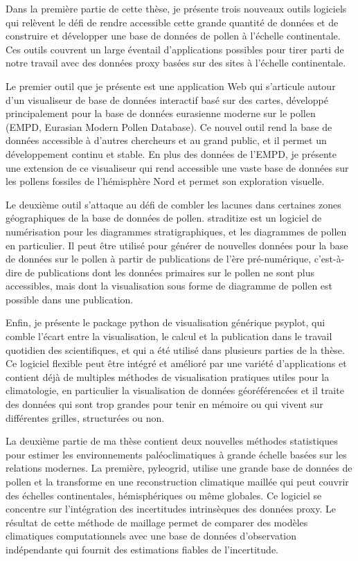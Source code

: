 \begin{thesisabstract}[]
Dans la première partie de cette thèse, je présente trois nouveaux outils logiciels qui relèvent le défi de rendre accessible cette grande quantité de données et de construire et développer une base de données de pollen à l'échelle continentale. Ces outils couvrent un large éventail d'applications possibles pour tirer parti de notre travail avec des données proxy basées sur des sites à l'échelle continentale.

Le premier outil que je présente est une application Web qui s'articule autour d'un visualiseur de base de données interactif basé sur des cartes, développé principalement pour la base de données eurasienne moderne sur le pollen (EMPD, Eurasian Modern Pollen Database). Ce nouvel outil rend la base de données accessible à d'autres chercheurs et au grand public, et il permet un développement continu et stable. En plus des données de l'EMPD, je présente une extension de ce visualiseur qui rend accessible une vaste base de données sur les pollens fossiles de l'hémisphère Nord et permet son exploration visuelle.

Le deuxième outil s'attaque au défi de combler les lacunes dans certaines zones géographiques de la base de données de pollen. straditize est un logiciel de numérisation pour les diagrammes stratigraphiques, et les diagrammes de pollen en particulier. Il peut être utilisé pour générer de nouvelles données pour la base de données sur le pollen à partir de publications de l’ère pré-numérique, c'est-à-dire de publications dont les données primaires sur le pollen ne sont plus accessibles, mais dont la visualisation sous forme de diagramme de pollen est possible dans une publication.

Enfin, je présente le package python de visualisation générique psyplot, qui comble l'écart entre la visualisation, le calcul et la publication dans le travail quotidien des scientifiques, et qui a été utilisé dans plusieurs parties de la thèse. Ce logiciel flexible peut être intégré et amélioré par une variété d'applications et contient déjà de multiples méthodes de visualisation pratiques utiles pour la climatologie, en particulier la visualisation de données géoréférencées et il traite des données qui sont trop grandes pour tenir en mémoire ou qui vivent sur différentes grilles, structurées ou non.

La deuxième partie de ma thèse contient deux nouvelles méthodes statistiques pour estimer les environnements paléoclimatiques à grande échelle basées sur les relations modernes. La première, pyleogrid, utilise une grande base de données de pollen et la transforme en une reconstruction climatique maillée qui peut couvrir des échelles continentales, hémisphériques ou même globales. Ce logiciel se concentre sur l'intégration des incertitudes intrinsèques des données proxy. Le résultat de cette méthode de maillage permet de comparer des modèles climatiques computationnels avec une base de données d'observation indépendante qui fournit des estimations fiables de l'incertitude.


\end{thesisabstract}

